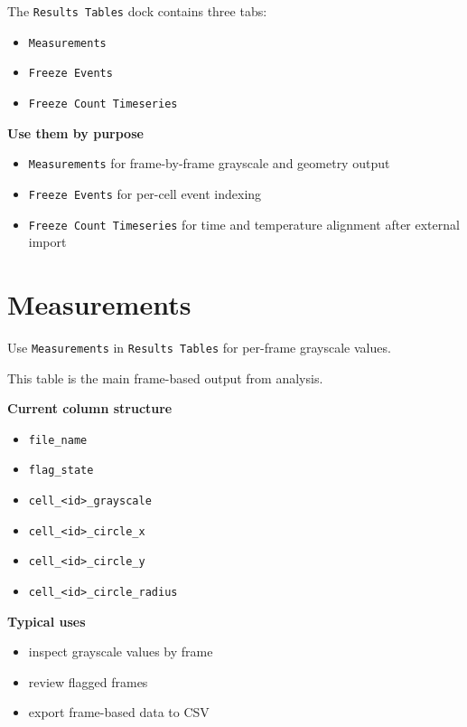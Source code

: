 \documentclass[
  9pt,
  letterpaper,
  oneside,
  open=any,
  DIV=15,
  parskip=half-,
  headings=big,
  numbers=noenddot
]{scrbook}
\newcommand{\manuallead}[1]{%
  \vspace{0.15em}%
  {\sffamily\bfseries\color{ManualBlue}#1}\par\nobreak\vspace{0.05em}%
}
\begin{document}
The \texttt{Results Tables} dock contains three tabs:


\begin{itemize}[leftmargin=*,itemsep=0.35em,topsep=0.4em]
\item \texttt{Measurements}
\item \texttt{Freeze Events}
\item \texttt{Freeze Count Timeseries}
\end{itemize}

\manuallead{Use them by purpose}

\begin{itemize}[leftmargin=*,itemsep=0.35em,topsep=0.4em]
\item \texttt{Measurements} for frame-by-frame grayscale and geometry output
\item \texttt{Freeze Events} for per-cell event indexing
\item \texttt{Freeze Count Timeseries} for time and temperature alignment after external import
\end{itemize}

\section{Measurements}

Use \texttt{Measurements} in \texttt{Results Tables} for per-frame grayscale values.


This table is the main frame-based output from analysis.


\manuallead{Current column structure}

\begin{itemize}[leftmargin=*,itemsep=0.35em,topsep=0.4em]
\item \texttt{file\_name}
\item \texttt{flag\_state}
\item \texttt{cell\_<id>\_grayscale}
\item \texttt{cell\_<id>\_circle\_x}
\item \texttt{cell\_<id>\_circle\_y}
\item \texttt{cell\_<id>\_circle\_radius}
\end{itemize}

\manuallead{Typical uses}

\begin{itemize}[leftmargin=*,itemsep=0.35em,topsep=0.4em]
\item inspect grayscale values by frame
\item review flagged frames
\item export frame-based data to CSV
\end{itemize}
\end{document}
